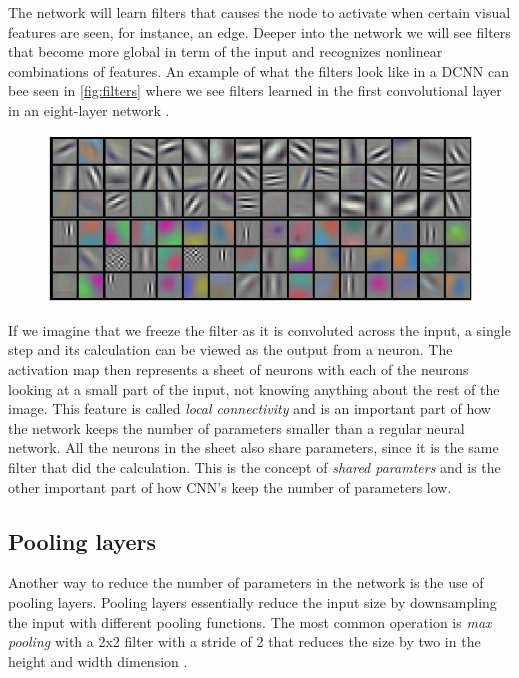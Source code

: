 The network will learn filters that causes the node to activate when certain visual features are seen, for instance, an edge. Deeper into the network we will see filters that become more global in term of the input and recognizes nonlinear combinations of features. An example of what the filters look like in a DCNN can bee seen in \autoref{fig:filters} where we see filters learned in the first convolutional layer in an eight-layer network \cite{Krizhevsky2012}.

\begin{figure}[H]
    \centering
    \includegraphics[width=\linewidth]{fig/filters.png}
    \label{fig:filters}
\end{figure}
If we imagine that we freeze the filter as it is convoluted across the input, a single step and its calculation can be viewed as the output from a neuron. The activation map then represents a sheet of neurons with each of the neurons looking at a small part of the input, not knowing anything about the rest of the image. This feature is called \emph{local connectivity} and is an important part of how the network keeps the number of parameters smaller than a regular neural network. All the neurons in the sheet also share parameters, since it is the same filter that did the calculation. This is the concept of \emph{shared paramters} and is the other important part of how CNN's keep the number of parameters low.

\subsection{Pooling layers}
Another way to reduce the number of parameters in the network is the use of pooling layers. Pooling layers essentially reduce the input size by downsampling the input with different pooling functions. The most common operation is \emph{max pooling} with a 2x2 filter with a stride of 2 that reduces the size by two in the height and width dimension \cite{Li}. 



















